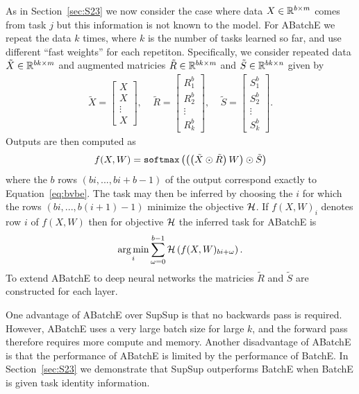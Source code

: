 \documentclass{article}
\DeclareMathOperator*{\argmin}{arg\,min}
\newcommand{\ac}{SupSup\xspace}
\newcommand{\comments}[1]{#1}
\newcommand{\comments}[1]{}
\newcommand{\vivekr}[1]{\comments{\textcolor{purple}{[vivek: #1]}}}
\begin{document}
As in Section~\ref{sec:S23} we now consider the case where data $X \in \mathbb{R}^{b \times m}$ comes from task $j$ but this information is not known to the model. For ABatchE we repeat the data $k$ times, where $k$ is the number of tasks learned so far, and use different ``fast weights'' for each repetiton. Specifically, we consider repeated data $\tilde X \in \mathbb{R}^{bk \times m}$ and augmented matricies $\tilde R \in \mathbb{R}^{bk \times m}$ and $\tilde S \in \mathbb{R}^{bk \times n}$ given by
\begin{align}
\tilde X = \begin{bmatrix} X \\ X \\ \vdots \\ X \end{bmatrix}, \ \ \ \ \ \tilde R =\begin{bmatrix} R^b_1 \\ R^b_2 \\ \vdots \\ R^b_k \end{bmatrix},  \ \ \ \ \   \tilde S =\begin{bmatrix} S^b_1 \\ S^b_2 \\ \vdots \\ S^b_k \end{bmatrix} .
\end{align}
Outputs are then computed as
\begin{align} \label{eq:bvabe}
    f(X, W) = \texttt{softmax}\left(  \left( \left( \tilde X \odot \tilde R  \right)  W \right) \odot \tilde S  \right)
\end{align}
where the $b$ rows $(bi,...,bi + b-1)$ of the output correspond exactly to Equation~\ref{eq:bvbe}. The task may then be inferred by choosing the $i$ for which the rows $(bi,...,b(i+1) - 1)$ minimize the objective $\mathcal{H}$. If $f(X, W)_i$ denotes row $i$ of $f(X, W)$ then for objective $\mathcal{H}$ the inferred task for ABatchE is
\begin{align}
    \argmin_i \sum_{\omega = 0}^{b-1} \Hcal\round{f(X, W)_{bi + \omega}}.
\end{align}
To extend ABatchE to deep neural networks the matricies $\tilde R$ and $\tilde S$ are constructed for each layer.

One advantage of ABatchE over \ac is that no backwards pass is required. However, ABatchE uses a very large batch size for large $k$, and the forward pass therefore requires more compute and memory. %
Another disadvantage of ABatchE is that the performance of ABatchE is limited by the performance of BatchE. In Section~\ref{sec:S23} we demonstrate that \ac outperforms BatchE when BatchE is given task identity information.
\end{document}
